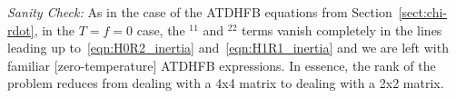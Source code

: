 \noindent\textit{Sanity Check:} As in the case of the ATDHFB equations from Section~\ref{sect:chi-rdot}, in the $T=f=0$ case, the $^{11}$ and $^{22}$ terms vanish completely in the lines leading up to~\eqref{eqn:H0R2_inertia} and~\eqref{eqn:H1R1_inertia} and we are left with familiar [zero-temperature] ATDHFB expressions. In essence, the rank of the problem reduces from dealing with a 4x4 matrix to dealing with a 2x2 matrix.



